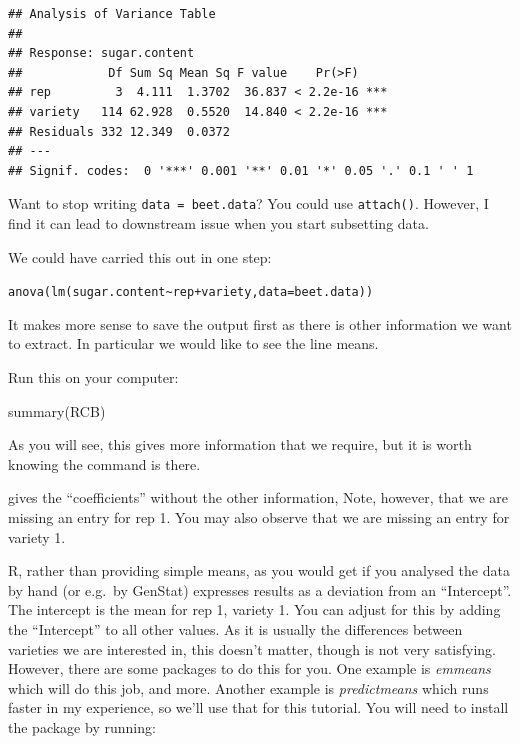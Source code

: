 \documentclass[
]{book}
\makeatletter
\newenvironment{Shaded}{\begin{snugshade}}{\end{snugshade}}
\newcommand{\FunctionTok}[1]{\textcolor[rgb]{0.00,0.00,0.00}{#1}}
\newcommand{\NormalTok}[1]{#1}
\newcommand{\SpecialCharTok}[1]{\textcolor[rgb]{0.00,0.00,0.00}{#1}}
\newenvironment{kframe}{%
\medskip{}
\setlength{\fboxsep}{.8em}
 \def\at@end@of@kframe{}%
 \ifinner\ifhmode%
  \def\at@end@of@kframe{\end{minipage}}%
  \begin{minipage}{\columnwidth}%
 \fi\fi%
 \def\FrameCommand##1{\hskip\@totalleftmargin \hskip-\fboxsep
 \colorbox{shadecolor}{##1}\hskip-\fboxsep
     \hskip-\linewidth \hskip-\@totalleftmargin \hskip\columnwidth}%
 \MakeFramed {\advance\hsize-\width
   \@totalleftmargin\z@ \linewidth\hsize
   \@setminipage}}%
 {\par\unskip\endMakeFramed%
 \at@end@of@kframe}
\newenvironment{rmdblock}[1]
  {
  \begin{itemize}
  \renewcommand{\labelitemi}{
    \raisebox{-.7\height}[0pt][0pt]{
      {\setkeys{Gin}{width=3em,keepaspectratio}\texttt{[image: images/\#1]}}
    }
  }
  \setlength{\fboxsep}{1em}
  \begin{kframe}
  \item
  }
  {
  \end{kframe}
  \end{itemize}
  }
\newenvironment{rmdnote}
  {\begin{rmdblock}{note}}
  {\end{rmdblock}}
\makeatother
\begin{document}
\begin{verbatim}
## Analysis of Variance Table
## 
## Response: sugar.content
##            Df Sum Sq Mean Sq F value    Pr(>F)    
## rep         3  4.111  1.3702  36.837 < 2.2e-16 ***
## variety   114 62.928  0.5520  14.840 < 2.2e-16 ***
## Residuals 332 12.349  0.0372                      
## ---
## Signif. codes:  0 '***' 0.001 '**' 0.01 '*' 0.05 '.' 0.1 ' ' 1
\end{verbatim}

\begin{rmdnote}
Want to stop writing \texttt{data\ =\ beet.data}? You could use \texttt{attach()}. However, I find it can lead to downstream issue when you start subsetting data.
\end{rmdnote}

We could have carried this out in one step:

\texttt{anova(lm(sugar.content\textasciitilde{}rep+variety,data=beet.data))}

It makes more sense to save the output first as there is other information we want to extract. In particular we would like to see the line means.

Run this on your computer:

\begin{Shaded}
\begin{Highlighting}[]
\FunctionTok{summary}\NormalTok{(RCB)}
\end{Highlighting}
\end{Shaded}

As you will see, this gives more information that we require, but it is worth knowing the command is there.

\begin{Shaded}
\end{Shaded}

gives the ``coefficients'' without the other information, Note, however, that we are missing an entry for rep 1. You may also observe that we are missing an entry for variety 1.

R, rather than providing simple means, as you would get if you analysed the data by hand (or e.g.~by GenStat) expresses results as a deviation from an ``Intercept''. The intercept is the mean for rep 1, variety 1. You can adjust for this by adding the ``Intercept'' to all other values. As it is usually the differences between varieties we are interested in, this doesn't matter, though is not very satisfying. However, there are some packages to do this for you. One example is \emph{emmeans} \citep{R-emmeans} which will do this job, and more. Another example is \emph{predictmeans} \citep{R-predictmeans} which runs faster in my experience, so we'll use that for this tutorial. You will need to install the package by running:
\end{document}
